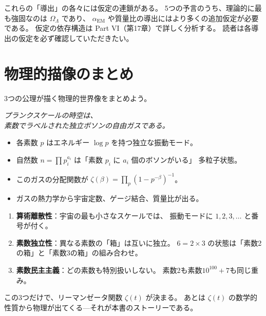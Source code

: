 \begin{warningbox}[誠実な注意]
これらの「導出」の各々には仮定の連鎖がある。
5つの予言のうち、理論的に最も強固なのは $\Omega_\Lambda$ であり、
$\alpha_{\mathrm{EM}}$ や質量比の導出にはより多くの追加仮定が必要である。
仮定の依存構造は Part VI（第17章）で詳しく分析する。
読者は各導出の仮定を必ず確認していただきたい。
\end{warningbox}


\section{物理的描像のまとめ}
\label{sec:axioms-summary}

3つの公理が描く物理的世界像をまとめよう。

\begin{keyresult}[算術的真空の描像]
\begin{center}
\emph{プランクスケールの時空は、\\
素数でラベルされた独立ボソンの自由ガスである。}
\end{center}

\begin{itemize}
  \item 各素数 $p$ はエネルギー $\log p$ を持つ独立な振動モード。
  \item 自然数 $n = \prod p_i^{a_i}$ は「素数 $p_i$ に $a_i$ 個のボソンがいる」
        多粒子状態。
  \item このガスの分配関数が $\zeta(\beta) = \prod_p (1 - p^{-\beta})^{-1}$。
  \item ガスの熱力学から宇宙定数、ゲージ結合、質量比が出る。
\end{itemize}
\end{keyresult}

\begin{hsbox}
\begin{enumerate}
  \item \textbf{算術離散性}：宇宙の最も小さなスケールでは、
        振動モードに $1, 2, 3, \ldots$ と番号が付く。
  \item \textbf{素数独立性}：異なる素数の「箱」は互いに独立。
        $6 = 2 \times 3$ の状態は「素数2の箱」と「素数3の箱」の組み合わせ。
  \item \textbf{素数民主主義}：どの素数も特別扱いしない。
        素数2も素数$10^{100}+7$も同じ重み。
\end{enumerate}
この3つだけで、リーマンゼータ関数 $\zeta(t)$ が決まる。
あとは $\zeta(t)$ の数学的性質から物理が出てくる---それが本書のストーリーである。
\end{hsbox}



